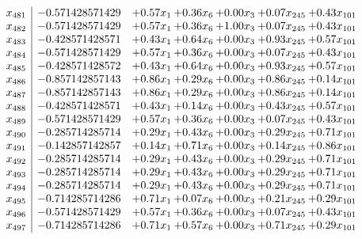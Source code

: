 \documentclass[8pt]{article}
\begin{document}
\[\begin{array}{c| c c@{\hskip 2pt} c@{\hskip 2pt} c@{\hskip 2pt} c@{\hskip 2pt} c@{\hskip 2pt} }
 x_{481}   &  -0.571428571429 & +  0.57 x_{1} & +  0.36 x_{6} & +  0.00 x_{3} & +  0.07 x_{245} & +  0.43 x_{101}\\
 x_{482}   &  -0.571428571429 & +  0.57 x_{1} & +  0.36 x_{6} & +  1.00 x_{3} & +  0.07 x_{245} & +  0.43 x_{101}\\
 x_{483}   &  -0.428571428571 & +  0.43 x_{1} & +  0.64 x_{6} & +  0.00 x_{3} & +  0.93 x_{245} & +  0.57 x_{101}\\
 x_{484}   &  -0.571428571429 & +  0.57 x_{1} & +  0.36 x_{6} & +  0.00 x_{3} & +  0.07 x_{245} & +  0.43 x_{101}\\
 x_{485}   &  -0.428571428572 & +  0.43 x_{1} & +  0.64 x_{6} & +  0.00 x_{3} & +  0.93 x_{245} & +  0.57 x_{101}\\
 x_{486}   &  -0.857142857143 & +  0.86 x_{1} & +  0.29 x_{6} & +  0.00 x_{3} & +  0.86 x_{245} & +  0.14 x_{101}\\
 x_{487}   &  -0.857142857143 & +  0.86 x_{1} & +  0.29 x_{6} & +  0.00 x_{3} & +  0.86 x_{245} & +  0.14 x_{101}\\
 x_{488}   &  -0.428571428571 & +  0.43 x_{1} & +  0.14 x_{6} & +  0.00 x_{3} & +  0.43 x_{245} & +  0.57 x_{101}\\
 x_{489}   &  -0.571428571429 & +  0.57 x_{1} & +  0.36 x_{6} & +  0.00 x_{3} & +  0.07 x_{245} & +  0.43 x_{101}\\
 x_{490}   &  -0.285714285714 & +  0.29 x_{1} & +  0.43 x_{6} & +  0.00 x_{3} & +  0.29 x_{245} & +  0.71 x_{101}\\
 x_{491}   &  -0.142857142857 & +  0.14 x_{1} & +  0.71 x_{6} & +  0.00 x_{3} & +  0.14 x_{245} & +  0.86 x_{101}\\
 x_{492}   &  -0.285714285714 & +  0.29 x_{1} & +  0.43 x_{6} & +  0.00 x_{3} & +  0.29 x_{245} & +  0.71 x_{101}\\
 x_{493}   &  -0.285714285714 & +  0.29 x_{1} & +  0.43 x_{6} & +  0.00 x_{3} & +  0.29 x_{245} & +  0.71 x_{101}\\
 x_{494}   &  -0.285714285714 & +  0.29 x_{1} & +  0.43 x_{6} & +  0.00 x_{3} & +  0.29 x_{245} & +  0.71 x_{101}\\
 x_{495}   &  -0.714285714286 & +  0.71 x_{1} & +  0.07 x_{6} & +  0.00 x_{3} & +  0.21 x_{245} & +  0.29 x_{101}\\
 x_{496}   &  -0.571428571429 & +  0.57 x_{1} & +  0.36 x_{6} & +  0.00 x_{3} & +  0.07 x_{245} & +  0.43 x_{101}\\
 x_{497}   &  -0.714285714286 & +  0.71 x_{1} & +  0.57 x_{6} & +  0.00 x_{3} & +  0.71 x_{245} & +  0.29 x_{101}\\

\end{array}\]
\end{document}
